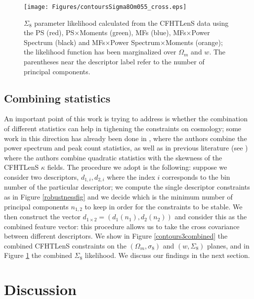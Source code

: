 \documentclass[reprint,aps,prd,superscriptaddress,showkeys,showpacs]{revtex4-1}
\begin{document}
\begin{figure}
\begin{center}
\texttt{[image: Figures/contoursSigma8Om055\_cross.eps]}
\end{center}
\caption{$\Sigma_8$ parameter likelihood calculated from the CFHTLenS data using the PS (red), PS$\times$Moments (green), MFs (blue), MFs$\times$Power Spectrum (black) and MFs$\times$Power Spectrum$\times$Moments (orange); the likelihood function has been marginalized over $\Omega_m$ and $w$. The parentheses near the descriptor label refer to the number of principal components.}
\label{likelihoodSi8cross}
\end{figure}

\subsection{Combining statistics}
An important point of this work is trying to address is whether the combination of different statistics can help in tighening the constraints on cosmology; some work in this direction has already been done in \citep{Companion}, where the authors combine the power spectrum and peak count statistics, as well as in previous literature (see \citep{CFHTFu}) where the authors combine quadratic statistics with the skewness of the CFHTLenS $\kappa$ fields. The procedure we adopt is the following: suppose we consider two descriptors, $d_{1,i},d_{2,i}$ where the index $i$ corresponds to the bin number of the particular descriptor; we compute the single descriptor constraints as in Figure \ref{robustnessfig} and we decide which is the minimum number of principal components $n_{1,2}$ to keep in order for the constraints to be stable. We then construct the vector $d_{1\times2} = (d_1(n_1),d_2(n_2))$ and consider this as the combined feature vector: this procedure allows us to take the cross covariance between different descriptors. We show in Figure \ref{contours3combined} the combined CFHTLenS constraints on the $(\Omega_m,\sigma_8)$ and $(w,\Sigma_8)$ planes, and in Figure \ref{likelihoodSi8cross} the combined $\Sigma_8$ likelihood. We discuss our findings in the next section. 



\section{Discussion}
\label{discussion}
\end{document}
